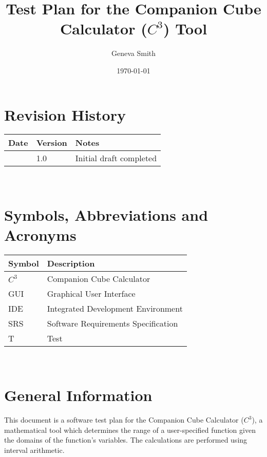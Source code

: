 \documentclass[12pt, titlepage]{article}
\newcommand{\progname}{Companion Cube Calculator} %
\newcommand{\prognameAbbrv}{$C^{3}$}
\begin{document}
\title{Test Plan for the \progname{} (\prognameAbbrv{}) Tool} 
\author{Geneva Smith}
\date{\today}
	
\maketitle


\section{Revision History}

\begin{tabularx}{\textwidth}{p{3cm}p{2cm}X}
\toprule {\bf Date} & {\bf Version} & {\bf Notes}\\
\midrule
 & 1.0 & Initial draft completed\\
\bottomrule
\end{tabularx}

~\newpage

\section{Symbols, Abbreviations and Acronyms}

\renewcommand{\arraystretch}{1.2}
\begin{tabular}{l l} 
  \toprule		
  \textbf{Symbol} & \textbf{Description}\\
  \midrule 
  \prognameAbbrv{} & \progname{}\\
  GUI & Graphical User Interface\\
  IDE & Integrated Development Environment\\
  SRS & Software Requirements Specification\\
  T & Test\\
  \bottomrule
\end{tabular}\\


\newpage

\tableofcontents



\newpage


\section{General Information}
This document is a software test plan for the \progname{} (\prognameAbbrv{}), a 
mathematical tool which determines the range of a user-specified function given 
the domains of the function's variables. The calculations are performed using 
interval arithmetic.
\end{document}
